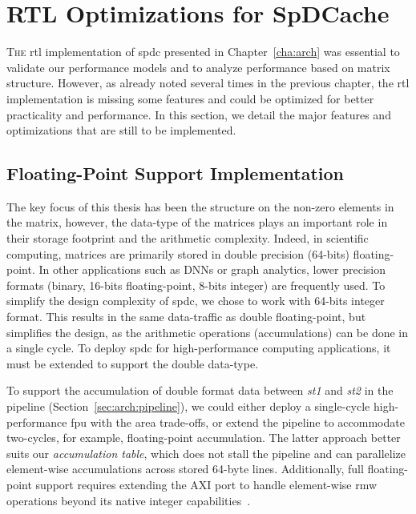 
\section{RTL Optimizations for SpDCache}
\label{sec:optim:rtloptims}

\lettrine{T}{he} \acrshort{rtl} implementation of \acrlong{spdc} presented in Chapter~\ref{cha:arch} was essential to validate our performance models and to analyze performance based on matrix structure.
However, as already noted several times in the previous chapter, the \acrshort{rtl} implementation is missing some features and could be optimized for better practicality and performance.
In this section, we detail the major features and optimizations that are still to be implemented.

\subsection{Floating-Point Support Implementation}
\label{sec:optim:rtloptims:fp}

The key focus of this thesis has been the structure on the non-zero elements in the matrix, however, the data-type of the matrices plays an important role in their storage footprint and the arithmetic complexity.
Indeed, in scientific computing, matrices are primarily stored in double precision (64-bits) floating-point.
In other applications such as DNNs or graph analytics, lower precision formats (\ex binary, 16-bits floating-point, 8-bits integer) are frequently used.
To simplify the design complexity of \acrlong{spdc}, we chose to work with 64-bits integer format.
This results in the same data-traffic as double floating-point, but simplifies the design, as the arithmetic operations (accumulations) can be done in a single cycle.
To deploy \acrlong{spdc} for high-performance computing applications, it must be extended to support the double data-type.

To support the accumulation of double format data between \textit{st1} and \textit{st2} in the \gls{pipeline} (Section~\ref{sec:arch:pipeline}), we could either deploy a single-cycle high-performance \acrshort{fpu} with the area trade-offs, or extend the \gls{pipeline} to accommodate two-cycles, for example, floating-point accumulation.
The latter approach better suits our \textit{accumulation table}, which does not stall the \gls{pipeline} and can parallelize element-wise accumulations across stored 64-byte lines.
Additionally, full floating-point support requires extending the AXI port to handle element-wise \acrfull{rmw} operations beyond its native integer capabilities~\cite{ARM2023_AXI}.

